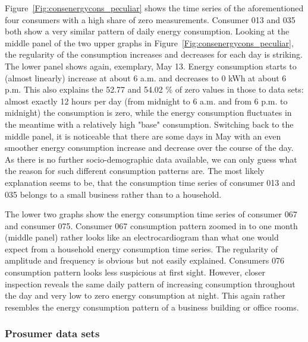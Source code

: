 Figure~\ref{Fig:consenergycons_peculiar} shows the time series of the aforementioned four consumers with a high share of zero measurements. Consumer 013 and 035 both show a very similar pattern of daily energy consumption. Looking at the middle panel of the two upper graphs in Figure~\ref{Fig:consenergycons_peculiar}, the regularity of the consumption increases and decreases for each day is striking. The lower panel shows again, exemplary, May 13. Energy consumption starts to (almost linearly) increase at about 6 a.m. and decreases to 0 kWh at about 6 p.m. This also explains the 52.77 and 54.02 \% of zero values in those to data sets: almost exactly 12 hours per day (from midnight to 6 a.m. and from 6 p.m. to midnight) the consumption is zero, while the energy consumption fluctuates in the meantime with a relatively high "base" consumption. Switching back to the middle panel, it is noticeable that there are some days in May with an even smoother energy consumption increase and decrease over the course of the day. As there is no further socio-demographic data available, we can only guess what the reason for such different consumption patterns are. The most likely explanation seems to be, that the consumption time series of consumer 013 and 035 belongs to a small business rather than to a household.

The lower two graphs show the energy consumption time series of consumer 067 and consumer 075. Consumer 067 consumption pattern zoomed in to one month (middle panel) rather looks like an electrocardiogram than what one would expect from a household energy consumption time series. The regularity of amplitude and frequency is obvious but not easily explained. Consumers 076 consumption pattern looks less suspicious at first sight. However, closer inspection reveals the same daily pattern of increasing consumption throughout the day and very low to zero energy consumption at night. This again rather resembles the energy consumption pattern of a business building or office rooms.



\subsubsection{Prosumer data sets}

